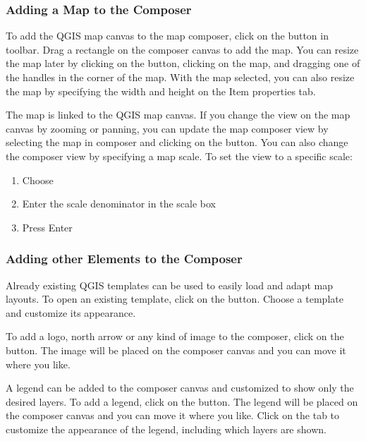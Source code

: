 \subsubsection{Adding a Map to the Composer}

To add the QGIS map canvas to the map composer, click on the
 button in toolbar. Drag a rectangle on the composer canvas to add the
map. You can resize the map later by clicking on the 
button, clicking on the map, and dragging one of the handles in the corner of
the map. With the map selected, you can also resize the map by specifying the
width and height on the Item properties tab.

The map is linked to the QGIS map canvas. If you change the view on the map
canvas by zooming or panning, you can update the map composer view by
selecting the map in composer and clicking on the  button.
You can also change the composer view by specifying a map scale. To set the
view to a specific scale:

\begin{enumerate}
\item Choose 
\item Enter the scale denominator in the scale box
\item Press Enter
\end{enumerate} 

\subsubsection{Adding other Elements to the Composer} 
 
Already existing QGIS templates can be used to easily load and adapt map
layouts. To open an existing template, click on the
 button. Choose a template and
customize its appearance. 

To add a logo, north arrow or any  kind of image to the composer, click on
the  button. The image will 
be placed on the composer canvas and you can move it where you like. 

A legend can be added to the composer canvas and customized to show only the
desired layers. To add a legend, click on the
 button. The legend will be
placed on the composer canvas and you can move it where you like. Click on
the  tab to customize the appearance of the legend, including
which layers are shown.

